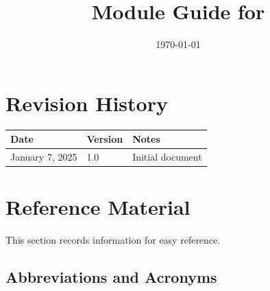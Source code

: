 \documentclass[12pt, titlepage]{article}
\begin{document}
\title{Module Guide for \progname{}} 
\author{\authname}
\date{\today}

\maketitle


\section{Revision History}

\begin{tabularx}{\textwidth}{p{3cm}p{2cm}X}
\toprule {\bf Date} & {\bf Version} & {\bf Notes}\\
\midrule
January 7, 2025 & 1.0 & Initial document\\
\bottomrule
\end{tabularx}

\newpage

\section{Reference Material}

This section records information for easy reference.

\subsection{Abbreviations and Acronyms}
\end{document}
